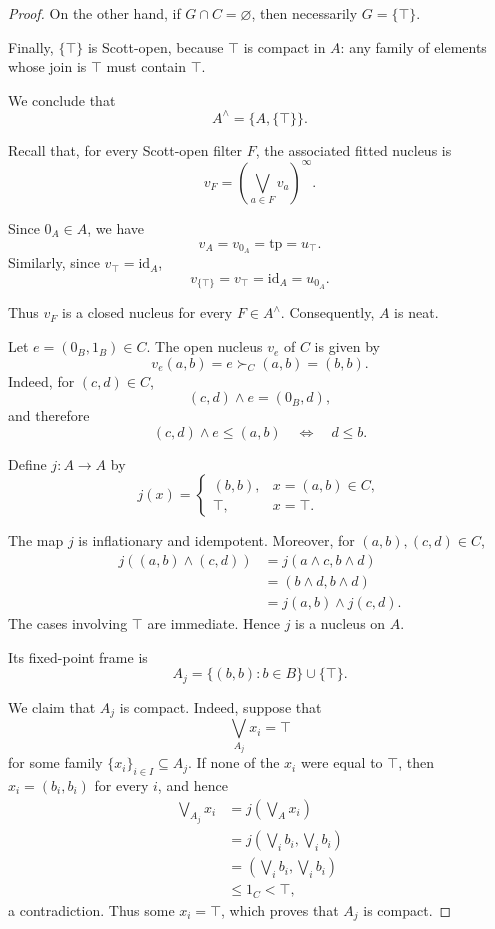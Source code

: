 \documentclass[11pt]{amsart}
\theoremstyle{plain}
\theoremstyle{definition}
\begin{document}
\begin{proof}
On the other hand, if $G\cap C=\varnothing$,
then necessarily $G=\{\top\}$.

Finally, $\{\top\}$ is Scott-open, because
$\top$ is compact in $A$: any family of elements
whose join is $\top$ must contain $\top$.

We conclude that
\[
A^\wedge=\{A,\{\top\}\}.
\]

Recall that, for every Scott-open filter $F$,
the associated fitted nucleus is
\[
v_F=\left(\bigvee_{a\in F}v_a\right)^\infty.
\]

Since $0_A\in A$, we have
\[
v_A=v_{0_A}=\mathrm{tp}=u_\top.
\]
Similarly, since $v_\top=\mathrm{id}_A$,
\[
v_{\{\top\}}=v_\top
=\mathrm{id}_A=u_{0_A}.
\]

Thus $v_F$ is a closed nucleus for every
$F\in A^\wedge$. Consequently, $A$ is neat.


Let $e=(0_B,1_B)\in C$. The open nucleus
$v_e$ of $C$ is given by
\[
v_e(a,b)=e\succ_C(a,b)=(b,b).
\]
Indeed, for $(c,d)\in C$,
\[
(c,d)\wedge e=(0_B,d),
\]
and therefore
\[
(c,d)\wedge e\leq(a,b)
\quad\Longleftrightarrow\quad d\leq b.
\]

Define $j:A\to A$ by
\[
j(x)=
\begin{cases}
(b,b),&x=(a,b)\in C,\\
\top,&x=\top.
\end{cases}
\]

The map $j$ is inflationary and idempotent.
Moreover, for $(a,b),(c,d)\in C$,
\[
\begin{aligned}
j((a,b)\wedge(c,d))
 &=j(a\wedge c,b\wedge d)\\
 &=(b\wedge d,b\wedge d)\\
 &=j(a,b)\wedge j(c,d).
\end{aligned}
\]
The cases involving $\top$ are immediate.
Hence $j$ is a nucleus on $A$.

Its fixed-point frame is
\[
A_j=\{(b,b):b\in B\}\cup\{\top\}.
\]

We claim that $A_j$ is compact. Indeed,
suppose that
\[
\bigvee_{A_j}x_i=\top
\]
for some family $\{x_i\}_{i\in I}\subseteq A_j$.
If none of the $x_i$ were equal to $\top$,
then $x_i=(b_i,b_i)$ for every $i$, and hence
\[
\begin{aligned}
\bigvee_{A_j}x_i
 &=j\left(\bigvee_A x_i\right)\\
 &=j\left(\bigvee_i b_i,\bigvee_i b_i\right)\\
 &=\left(\bigvee_i b_i,\bigvee_i b_i\right)\\
 &\leq 1_C<\top,
\end{aligned}
\]
a contradiction. Thus some $x_i=\top$,
which proves that $A_j$ is compact.


\end{proof}
\end{document}

